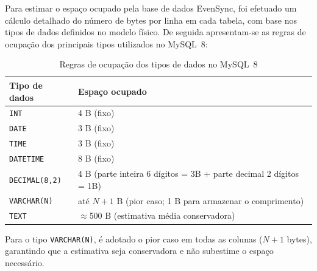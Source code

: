 \documentclass[runningheads]{llncs}
\begin{document}
                Para estimar o espaço ocupado pela base de dados EvenSync, foi efetuado um cálculo
                detalhado do número de bytes por linha em cada tabela, com base nos tipos de dados
                definidos no modelo físico. De seguida apresentam-se as regras de ocupação dos
                principais tipos utilizados no MySQL~8:

                \begin{table}[H]
                \centering
                \renewcommand{\arraystretch}{1.3}
                \begin{tabular}{|l|l|}
                \hline
                \textbf{Tipo de dados} & \textbf{Espaço ocupado} \\ \hline
                \texttt{INT}             & 4 B (fixo) \\ \hline
                \texttt{DATE}            & 3 B (fixo) \\ \hline
                \texttt{TIME}            & 3 B (fixo) \\ \hline
                \texttt{DATETIME}        & 8 B (fixo) \\ \hline
                \texttt{DECIMAL(8,2)}    & 4 B (parte inteira 6 dígitos = 3B + parte decimal 2 dígitos = 1B) \\ \hline
                \texttt{VARCHAR(N)}      & até $N + 1$ B (pior caso; 1 B para armazenar o comprimento) \\ \hline
                \texttt{TEXT}            & $\approx$500 B (estimativa média conservadora) \\ \hline
                \end{tabular}
                \vspace{0.2cm}
                \caption{Regras de ocupação dos tipos de dados no MySQL~8} \label{tab:tipos_bytes}
                \end{table}

                Para o tipo \texttt{VARCHAR(N)}, é adotado o pior caso em todas as colunas ($N + 1$ bytes), garantindo que a estimativa seja conservadora e não subestime o espaço necessário.
\end{document}
